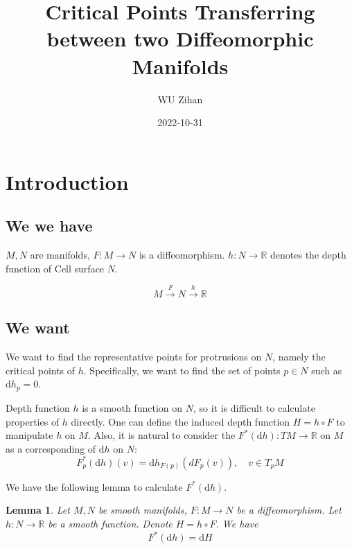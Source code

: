 \documentclass{article}
\author{WU Zihan}
\date{2022-10-31}
\title{Critical Points Transferring between two Diffeomorphic Manifolds}
\newtheorem{lemma}[theorem]{Lemma}
\begin{document}
\maketitle
\section{Introduction}
\subsection{We we have}
$M,N$ are manifolds, $F:M\rightarrow N$ is a diffeomorphism. $h:N\rightarrow \mathbb{R}$ denotes the depth function of Cell surface $N$.

\begin{equation}
  M \overset{F}{\rightarrow }  N \overset{h}{\rightarrow} \mathbb{R} 
\end{equation}

\subsection{We want}
We want to find the representative points for protrusions on $N$, namely the critical points of $h$.
Specifically, we want to find the set of points $p \in N$ such as $\mathrm{d}h_p=0$. \cite[Exercise 11.24]{lee2013IntroductionSmoothManifolds}

Depth function $h$ is a smooth function on $N$, so it is difficult to calculate properties of $h$ directly.
One can define the induced depth function $H = h \circ F$ to manipulate $h$ on $M$.
Also, it is natural to consider the $F^*(\mathrm{d}h): TM \to \mathbb{R}$ on $M$ as a corresponding of $\mathrm{d}h$ on $N$:
\begin{equation}
  F_p^*(\mathrm{d}h)(v)=\mathrm{d}h_{F(p)}\left(d F_p(v)\right), \quad  v \in T_p M
\end{equation}





We have the following lemma to calculate $F^*(\mathrm{d}h)$. \cite[Proposition 11.25]{lee2013IntroductionSmoothManifolds}

\begin{lemma}
  \label{lemma:1}
  Let $M, N$ be smooth manifolds, $F: M\rightarrow N$ be a diffeomorphism. Let $h: N\rightarrow \mathbb{R}$ be a smooth function. Denote $H = h \circ F$. We have
    \begin{equation}
    F^*(\mathrm{d}h) = \mathrm{d}H
  \end{equation}
\end{lemma}
\end{document}
